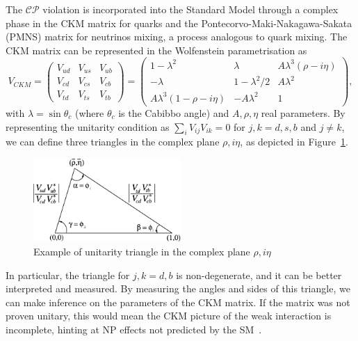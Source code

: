  The $\mathcal{CP}$ violation is incorporated into the Standard Model through a complex phase in the CKM matrix for quarks and the Pontecorvo-Maki-Nakagawa-Sakata (PMNS) matrix for neutrinos mixing, a process analogous to quark mixing. The CKM matrix can be represented in the Wolfenstein parametrisation as 
 \begin{equation}
 V_{CKM} = 
     \begin{pmatrix}
         V_{ud} & V_{us} & V_{ub}\\
         V_{cd} & V_{cs} & V_{cb}\\
         V_{td} & V_{ts} & V_{tb}
     \end{pmatrix}
     =
     \begin{pmatrix}
         1-\lambda^2 & \lambda & A\lambda^3(\rho-i\eta)\\
         -\lambda & 1-\lambda^2/2 & A\lambda^2\\
         A\lambda^3(1-\rho-i\eta) & -A\lambda^2 &1
     \end{pmatrix},
 \end{equation}
 with $\lambda = \sin\theta_c$ (where $\theta_c$ is the Cabibbo angle) and $A,\rho,\eta$ real parameters.
 By representing the unitarity condition as $\sum_i V_{ij} V_{ik}=0$ for $j,k=d,s,b$ and $j\neq k$, we can define three triangles in the complex plane $\rho,i\eta$, as depicted in Figure~\ref{fig:unitary-triangle}.
 \begin{figure}
     \centering
     \includegraphics[width=0.5\textwidth]{figures/The-CKM-unitarity-triangle-Figure-from-Ref-4.png}
     \caption{Example of unitarity triangle in the complex plane  $\rho,i\eta$}
     \label{fig:unitary-triangle}
 \end{figure}
 In particular, the triangle for $j,k=d,b$ is non-degenerate, and it can be better interpreted and measured. By measuring the angles and sides of this triangle, we can make inference on the parameters of the CKM matrix. If the matrix was not proven unitary, this would mean the CKM picture of the weak interaction is incomplete, hinting at NP effects not predicted by the SM~\cite{PhysRevLett.10.531, 10.1143/PTP.49.652}. 

